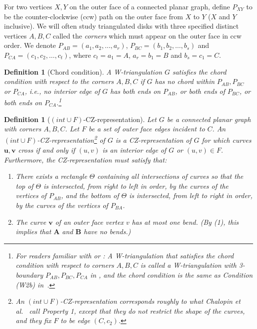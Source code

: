 \documentclass{article}
\renewcommand{\int}[1]{$(\mathit{int}\cup{#1})$}
\newcommand{\bb}[1]{\ensuremath{\mathbf{#1}}}
\newtheorem{definition}[theorem]{Definition}
\begin{document}
For two vertices $X, Y$ on the outer face of a connected planar graph,
define $P_{XY}$ to be the counter-clockwise (ccw) path on the outer face from $X$ to $Y$ ($X$ and $Y$ inclusive).
We will often study triangulated disks with
three specified distinct vertices $A,B,C$ called the {\em corners}
which must appear on the outer face in ccw order. 
We denote $P_{AB} = (a_1, a_2, \ldots, a_r)$, $P_{BC} = (b_1, b_2, \ldots, b_s)$ 
and $P_{CA} = (c_1,c_2,\ldots,c_t)$, where $c_t = a_1 = A$, $a_r = b_1 = B$ 
and $b_s = c_1 = C$. 

\begin{definition}[Chord condition]
\label{def:chord-condition}
A W-triangulation $G$ satisfies the \emph{chord condition} with respect
to the corners $A,B,C$ if $G$ has no chord within $P_{AB}, P_{BC}$ or $P_{CA}$,
i.e., no interior edge of $G$ has 
both ends on $P_{AB}$, or both ends of $P_{BC}$, or
both ends on $P_{CA}$.\footnote{For readers familiar with \cite{cit:chalopin-string}
or \cite{cit:ham-cycle}:
A W-triangulation that satisfies the chord condition with respect
to corners $A,B,C$ is called a \emph{W-triangulation 
with 3-boundary $P_{AB},P_{BC},P_{CA}$} 
in \cite{cit:chalopin-string},
and the chord condition is 
the same as \emph{Condition (W2b)} in~\cite{cit:ham-cycle}.}\end{definition}


\begin{definition}[\int{F}-CZ-representation]
Let $G$ be a connected planar graph with corners $A,B,C$. 
Let $F$ be a set of outer face edges incident to $C$.
An \emph{\int{F}-CZ-representation}\footnote{An \int{F}-CZ-representation corresponds roughly to what Chalopin
et al.~\cite{cit:chalopin-string} call Property 1, except that they do not
restrict the shape of the curves, and they fix $F$ to be edge $(C,c_2)$.}
of $G$ is a CZ-representation of $G$ for which curves $\bb{u},\bb{v}$ cross if and
only if $(u,v)$ is an interior edge of $G$ or $(u,v) \in F$. 
Furthermore, the CZ-representation must satisfy that:
\begin{enumerate}
    \item There exists a rectangle $\Theta$ containing all intersections 
    of curves so that the top of $\Theta$ is intersected, from right to 
	left in order, by the curves of the vertices of $P_{AB}$, 
and the bottom
    of $\Theta$ is intersected, from left to right in order, 
by the curves of the vertices of $P_{BA}$. 
    \item The curve $\bb{v}$ of an outer face vertex $v$ has at most one
    bend. (By (1), this implies that $\bb{A}$ and $\bb{B}$ have no bends.)
\end{enumerate}
\end{definition}
\end{document}
